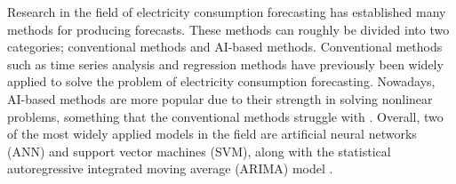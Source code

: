 Research in the field of electricity consumption forecasting has established many methods for producing forecasts. These methods can roughly be divided into two categories; conventional methods and AI-based methods. Conventional methods such as time series analysis and regression methods have previously been widely applied to solve the problem of electricity consumption forecasting. Nowadays, AI-based methods are more popular due to their strength in solving nonlinear problems, something that the conventional methods struggle with \cite{mat_daut_building_2017}. Overall, two of the most widely applied models in the field are artificial neural networks (ANN) and support vector machines (SVM), along with the statistical autoregressive integrated moving average (ARIMA) model \cite{nti_electricity_2020}.





